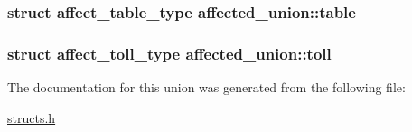 \hypertarget{unionaffected__union_a2c380a11438c35d00530f5b4b1ad85b2}{
\subsubsection[{table}]{\setlength{\rightskip}{0pt plus 5cm}struct {\bf affect\-\_\-table\-\_\-type} affected\-\_\-union\-::table}}\label{unionaffected__union_a2c380a11438c35d00530f5b4b1ad85b2}
\hypertarget{unionaffected__union_a48d27b254d038db067fffab88abc9ac5}{
\subsubsection[{toll}]{\setlength{\rightskip}{0pt plus 5cm}struct {\bf affect\-\_\-toll\-\_\-type} affected\-\_\-union\-::toll}}\label{unionaffected__union_a48d27b254d038db067fffab88abc9ac5}


The documentation for this union was generated from the following file\-:\begin{DoxyCompactItemize}
\item 
\hyperlink{structs_8h}{structs.\-h}\end{DoxyCompactItemize}
